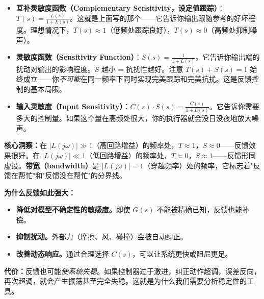 \begin{itemize}
    \item \textbf{互补灵敏度函数（Complementary Sensitivity，设定值跟踪）}：$T(s) = \frac{L(s)}{1 + L(s)}$。这就是上面写的那个——它告诉你输出跟随参考的好坏程度。理想情况下，$T(s) \approx 1$（低频处跟踪良好），$T(s) \approx 0$（高频处抑制噪声）。

    \item \textbf{灵敏度函数（Sensitivity Function）}：$S(s) = \frac{1}{1 + L(s)}$。它告诉你输出端的扰动对输出的影响程度。$S$ 越小 = 抗扰性越好。注意 $T(s) + S(s) = 1$ 始终成立——你\textit{不可能}在同一频率下同时实现完美跟踪和完美抗扰。这是反馈控制的基本局限。

    \item \textbf{输入灵敏度（Input Sensitivity）}：$C(s) \cdot S(s) = \frac{C(s)}{1 + L(s)}$。它告诉你需要多大的控制量。如果这个量在高频处很大，你的执行器就会没日没夜地放大噪声。
\end{itemize}

\textbf{核心洞察：}在 $|L(j\omega)| \gg 1$（高回路增益）的频率处，$T \approx 1$，$S \approx 0$——反馈效果很好。在 $|L(j\omega)| \ll 1$（低回路增益）的频率处，$T \approx 0$，$S \approx 1$——反馈形同虚设。\textbf{带宽（bandwidth）}是 $|L(j\omega)| = 1$（穿越频率）处的频率，它标志着"反馈在帮忙"和"反馈没在帮忙"的分界线。

\textbf{为什么反馈如此强大：}
\begin{itemize}
    \item \textbf{降低对模型不确定性的敏感度。}即使 $G(s)$ 不能被精确已知，反馈也能补偿。
    \item \textbf{抑制扰动。}外部力（摩擦、风、碰撞）会被自动纠正。
    \item \textbf{改善动态响应。}通过合理选择 $C(s)$，可以让系统更快或阻尼更足。
\end{itemize}

\textbf{代价：}反馈也可能\textit{使系统失稳}。如果控制器过于激进，纠正动作超调，误差反向，再次超调，就会产生振荡甚至完全失稳。这就是为什么我们需要分析稳定性的工具。

